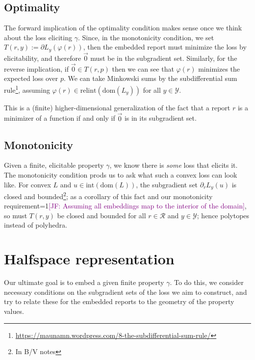 \documentclass[12pt]{article}
\newcommand{\Comments}{1}
\newcommand{\mynote}[2]{\ifnum\Comments=1\textcolor{#1}{#2}\fi}
\newcommand{\jessie}[1]{\mynote{purple}{[JF: #1]}}
\newcommand{\dom}{\mathrm{dom}}
\newcommand{\relint}{\mathrm{relint}}
\newcommand{\R}{\mathcal{R}}
\newcommand{\Y}{\mathcal{Y}}
\newcommand{\inprod}[2]{\langle #1, #2 \rangle}%
\newcommand{\inter}[1]{\mathrm{int}(#1)}%
\newcommand{\conv}{\mathrm{conv}}
\begin{document}
\subsection*{Optimality}
The forward implication of the optimality condition makes sense once we think about the loss eliciting $\gamma$.
Since, in the monotonicity condition, we set $T(r,y) := \partial L_y(\varphi(r))$, then the embedded report must minimize the loss by elicitability, and therefore $\vec 0$ must be in the subgradient set.
Similarly, for the reverse implication, if $\vec 0 \in T(r,p)$ then we can see that $\varphi(r)$ minimizes the expected loss over $p$.
We can take Minkowski sums by the subdifferential sum rule\footnote{\url{https://maunamn.wordpress.com/8-the-subdifferential-sum-rule/}}, assuming $\varphi(r) \in \relint(\dom(L_y))$ for all $y \in \Y$.


This is a (finite) higher-dimensional generalization of the fact that a report $r$ is a minimizer of a function if and only if $\vec 0$ is in its subgradient set.

\subsection*{Monotonicity}
Given a finite, elicitable property $\gamma$, we know there is \emph{some} loss that elicits it.
The monotonicity condition prods us to ask what such a convex loss can look like.
For convex $L$ and $u \in \inter{\dom(L)}$, the subgradient set $\partial_r L_y(u)$ is closed and bounded\footnote{In B/V notes}; as a corollary of this fact and our monotonicity requirement\jessie{Assuming all embeddings map to the interior of the domain}, so must $T(r,y)$ be closed and bounded for all $r \in \R$ and $y \in \Y$; hence polytopes instead of polyhedra. 

%



\section{Halfspace representation}
Our ultimate goal is to embed a given finite property $\gamma$.
To do this, we consider necessary conditions on the subgradient sets of the loss we aim to construct, and try to relate these for the embedded reports to the geometry of the property values.
\end{document}
